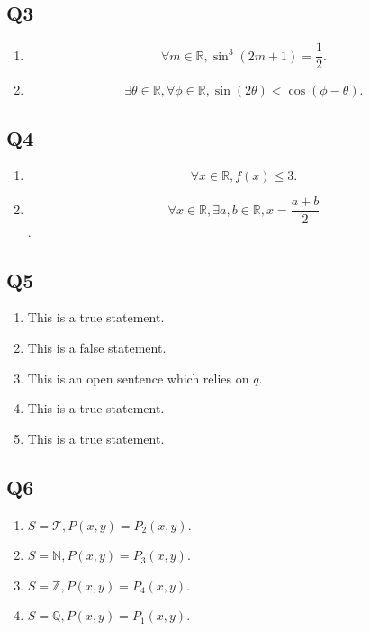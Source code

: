 \documentclass[11pt]{article}
\newcommand{\paren}[1]{\left(#1\right)}
\newcommand{\R}{\mathbb{R}}
\newcommand{\N}{\mathbb{N}}
\newcommand{\Z}{\mathbb{Z}}
\newcommand{\Q}{\mathbb{Q}}
\begin{document}
\maketitle
\tableofcontents
\newpage

\subsection*{Q3}
\begin{enumerate}[label = (\alph*)]
    \item \begin{equation*}
        \forall m \in \R, \sin^3\paren{2m + 1} = \frac{1}{2}. 
    \end{equation*}
    \item \begin{equation*}
        \exists \theta \in \R, \forall \phi \in \R, \sin \paren{2\theta} < \cos \paren{\phi - \theta}. 
    \end{equation*}
\end{enumerate}

\subsection*{Q4}
\begin{enumerate} [label=(\alph*)]
  \item $$\forall x \in \R, f(x) \leq 3. $$
  \item $$\forall x \in \R, \exists a, b \in \R, x = \frac{a + b }{2}$$. 
\end{enumerate}

\subsection*{Q5}
\begin{enumerate}
  [label=(\alph*)]
  \item This is a true statement. 
  \item This is a false statement. 
  \item This is an open sentence which relies on $q$. 
  \item This is a true statement. 
  \item This is a true statement. 
\end{enumerate}

\subsection*{Q6}
\begin{enumerate}
  [label = (\alph*)]
  \item $S = \mathcal{T}, P(x, y) = P_2(x, y)$. 
  \item $S = \N, P(x, y) = P_3(x, y)$. 
  \item $S = \Z, P(x, y) = P_4(x, y)$. 
  \item $S = \Q, P(x, y) = P_1(x, y)$. 
\end{enumerate}
\end{document}
